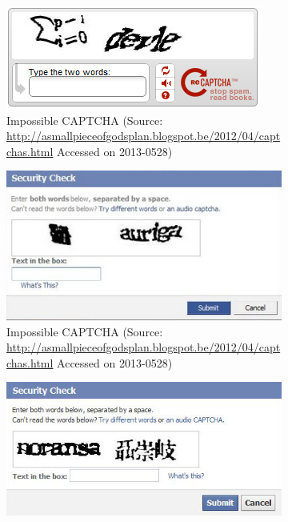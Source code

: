 \documentclass[pdftex,a4paper,12pt,twoside]{report}
\theoremstyle{plain} \newtheorem{theorem}{Theorem} \newtheorem{proposition}{Proposition} \newtheorem{lemma}{Lemma} \newtheorem*{corollary}{Corollary}
\theoremstyle{definition} \newtheorem{definition}{Definition} \newtheorem{conjecture}{Conjecture} \newtheorem*{example}{Example} \newtheorem{algorithm}{Algorithm}
\theoremstyle{remark} \newtheorem*{remark}{Remark} \newtheorem*{note}{Note} \newtheorem{case}{Case}
\begin{document}
\begin{figure}
\centering
	\begin{subfigure}[b]{0.65\textwidth}
		\centering
		\includegraphics[width=\textwidth]{./img/impossible_captcha01.png}
		\caption{Impossible CAPTCHA (Source: \url{http://asmallpieceofgodsplan.blogspot.be/2012/04/captchas.html} Accessed on 2013-0528)}
	\end{subfigure}
	\begin{subfigure}[b]{0.65\textwidth}
		\centering
		\includegraphics[width=\textwidth]{./img/impossible_captcha02.png}
		\caption{Impossible CAPTCHA (Source: \url{http://asmallpieceofgodsplan.blogspot.be/2012/04/captchas.html} Accessed on 2013-0528)}
	\end{subfigure}
	\begin{subfigure}[b]{0.65\textwidth}
		\centering
		\includegraphics[width=\textwidth]{./img/impossible_captcha03.png}

\end{subfigure}
\end{figure}
\end{document}
